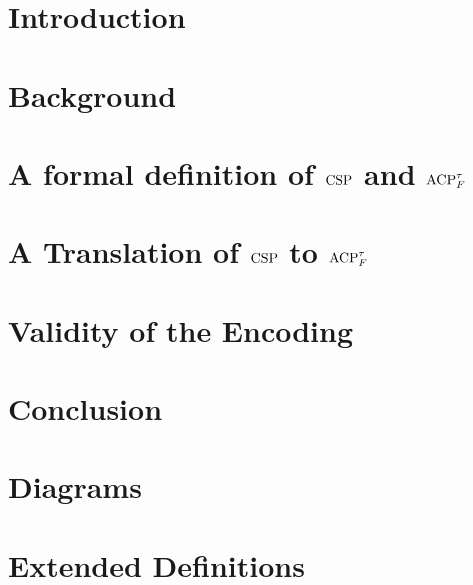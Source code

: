 \documentclass[logo,bsc,singlespacing,parskip,online]{infthesis}
\begin{document}
\chapter{Introduction}


\chapter{Background}


\chapter{A formal definition of \texorpdfstring{$\mathrm{CSP}$}{CSP} and \texorpdfstring{$\mathrm{ACP}_{F}^{\tau}$}{ACP}}


\chapter{A Translation of \texorpdfstring{$\mathrm{CSP}$}{CSP} to \texorpdfstring{$\mathrm{ACP}_{F}^{\tau}$}{ACP}}



\chapter{Validity of the Encoding}


\chapter{Conclusion}






\appendix

\chapter{Diagrams}


\chapter{Extended Definitions}

\end{document}
